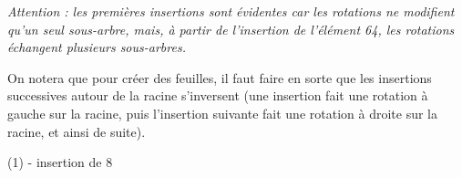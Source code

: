 \documentclass[11pt,a4paper]{article}
\begin{document}
\textit{Attention : les premières insertions sont évidentes car les rotations ne modifient qu'un seul sous-arbre, mais, à partir de l'insertion de l'élément 64, les rotations échangent plusieurs sous-arbres.}

On notera que pour créer des feuilles, il faut faire en sorte que les insertions successives autour de la racine s'inversent (une insertion fait une rotation à gauche sur la racine, puis l'insertion suivante fait une rotation à droite sur la racine, et ainsi de suite).

\bigskip

\vfillFirst

\begin{center}

\bigskip

(1) - insertion de 8
\end{center}

\bigskip
\bigskip
\end{document}
